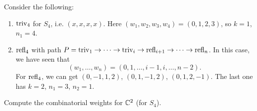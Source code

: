 \begin{example}
  Consider the following:
  \begin{enumerate}
    \item $\operatorname{triv}_4$ for $S_4$, i.e.
      $(x, x, x, x)$.
      Here $(w_1, w_2, w_3, w_4) = (0, 1, 2, 3)$, so
      $k = 1$, $n_1 = 4$.
    \item $\operatorname{refl}_4$ with path
      $P = \operatorname{triv}_1 \to \dots \to \operatorname{triv}_i \to \operatorname{refl}_{i + 1} \to \dots \to \operatorname{refl}_n$. In
      this case, we have seen that
      \[
        (w_1, \dots, w_n)
        = (0, 1, \dots, i - 1, i, \dots, n - 2).
      \]
      For $\operatorname{refl}_4$, we can get
      $(0, -1, 1, 2)$, $(0, 1, -1, 2)$,
      $(0, 1, 2, -1)$. The last one has
      $k = 2$, $n_1 = 3$, $n_2 = 1$.
  \end{enumerate}
\end{example}

\begin{exercise}
  Compute the combinatorial weights
  for $\mathbb{C}^2$ (for $S_4$).
\end{exercise}
